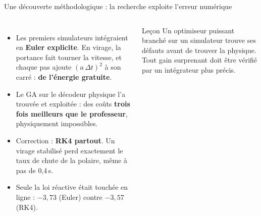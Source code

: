 \documentclass[aspectratio=169,10pt]{beamer}
\newcommand{\bad}[1]{\textcolor{sink}{\textbf{#1}}}
\begin{document}
\begin{frame}{Une découverte méthodologique : la recherche exploite l'erreur numérique}
  \begin{columns}[T]
    \small
    \begin{itemize}
      \item Les premiers simulateurs intégraient en \textbf{Euler explicite}. En virage, la portance fait tourner la vitesse, et chaque pas ajoute $(a\,\Delta t)^2$ à son carré : \bad{de l'énergie gratuite}.
      \item Le GA sur le décodeur physique l'a trouvée et exploitée : des coûts \bad{trois fois meilleurs que le professeur}, physiquement impossibles.
      \item Correction : \textbf{RK4 partout}. Un virage stabilisé perd exactement le taux de chute de la polaire, même à pas de 0{,}4\,s.
      \item Seule la loi réactive était touchée en ligne : $-3{,}73$ (Euler) contre $-3{,}57$ (RK4).
    \end{itemize}
    \begin{block}{Leçon}
      \small Un optimiseur puissant branché sur un simulateur trouve ses défauts avant de trouver la physique. Tout gain surprenant doit être vérifié par un intégrateur plus précis.
    \end{block}
  \end{columns}
\end{frame}
\end{document}
